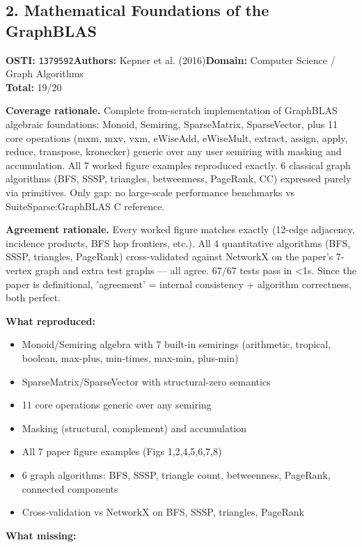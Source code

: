 \subsection{2. Mathematical Foundations of the GraphBLAS}
\textbf{OSTI:} \texttt{1379592}\quad\textbf{Authors:} Kepner et al. (2016)\quad\textbf{Domain:} Computer Science / Graph Algorithms\\
\quad{}\quad\textbf{Total:} 19/20\par\smallskip
\noindent\textbf{Coverage rationale.} Complete from-scratch implementation of GraphBLAS algebraic foundations: Monoid, Semiring, SparseMatrix, SparseVector, plus 11 core operations (mxm, mxv, vxm, eWiseAdd, eWiseMult, extract, assign, apply, reduce, transpose, kronecker) generic over any user semiring with masking and accumulation. All 7 worked figure examples reproduced exactly. 6 classical graph algorithms (BFS, SSSP, triangles, betweenness, PageRank, CC) expressed purely via primitives. Only gap: no large-scale performance benchmarks vs SuiteSparse:GraphBLAS C reference.\par
\noindent\textbf{Agreement rationale.} Every worked figure matches exactly (12-edge adjacency, incidence products, BFS hop frontiers, etc.). All 4 quantitative algorithms (BFS, SSSP, triangles, PageRank) cross-validated against NetworkX on the paper's 7-vertex graph and extra test graphs --- all agree. 67/67 tests pass in \textless{}1s. Since the paper is definitional, 'agreement' = internal consistency + algorithm correctness, both perfect.\par\smallskip
\noindent\textbf{What reproduced:}
\begin{itemize}[leftmargin=1.4em,itemsep=0.2em,topsep=0.2em]
\item Monoid/Semiring algebra with 7 built-in semirings (arithmetic, tropical, boolean, max-plus, min-times, max-min, plus-min)
\item SparseMatrix/SparseVector with structural-zero semantics
\item 11 core operations generic over any semiring
\item Masking (structural, complement) and accumulation
\item All 7 paper figure examples (Figs 1,2,4,5,6,7,8)
\item 6 graph algorithms: BFS, SSSP, triangle count, betweenness, PageRank, connected components
\item Cross-validation vs NetworkX on BFS, SSSP, triangles, PageRank
\end{itemize}\noindent\textbf{What missing:}
